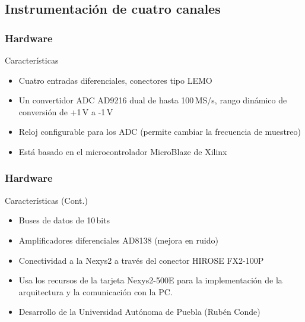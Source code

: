 \documentclass{beamer}
\begin{document}
\subsection{Instrumentación de cuatro canales}
\begin{frame}
  \begin{center}
    \Huge{\color{blue}{Las electrónicas: \\ Placa de adquisición de cuatro canales}}
  \end{center}
\end{frame}

\begin{frame}
	\frametitle{Hardware}
		\begin{exampleblock}{Características}
			\begin{itemize}
				\item Cuatro \alert{entradas diferenciales}, conectores tipo
							\alert{LEMO}
				\item Un convertidor ADC \alert{AD9216} dual de hasta \alert{100\,MS/s},
							rango dinámico de conversión de +1\,V a -1\,V
				\item Reloj configurable para los ADC (permite cambiar la frecuencia de
							muestreo)
				\item Está basado en el microcontrolador \alert{MicroBlaze} de Xilinx
			\end{itemize}
		\end{exampleblock}
\end{frame}

\begin{frame}
	\frametitle{Hardware}
		\begin{exampleblock}{Características (Cont.)}
			\begin{itemize}
				\item Buses de datos de 10\,bits
				\item Amplificadores diferenciales \alert{AD8138} (mejora en ruido)
				\item Conectividad a la Nexys2 a través del conector HIROSE FX2-100P
				\item Usa los recursos de la tarjeta \alert{Nexys2-500E} para la
							implementación de la arquitectura y la comunicación con la PC.
				\item Desarrollo de la Universidad Autónoma de Puebla (Rubén
							Conde)
			\end{itemize}
		\end{exampleblock}
\end{frame}
\end{document}
